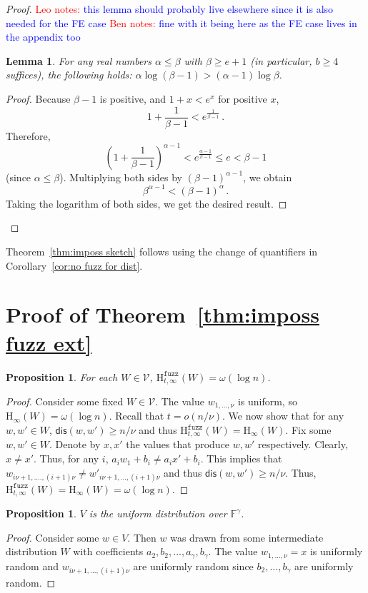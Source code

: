 \documentclass[11pt]{article}
\newcommand{\thref}[1]{\mbox{Theorem~\ref{#1}}}
\newcommand{\corref}[1]{\mbox{Corollary~\ref{#1}}}
\newcommand{\dis}{\ensuremath{\mathsf{dis}}}
\newcommand{\Hoo}{\mathrm{H}_\infty}
\newcommand{\Hfuzz}{\mathrm{H}^{\mathtt{fuzz}}_{t,\infty}}
\newtheorem{lemma}[theorem]{Lemma}
\newtheorem{proposition}[theorem]{Proposition}
\newcommand{\authnote}[2]{{\textcolor{red}{\textsf{#1 notes: }\textcolor{blue}{ #2}}\marginpar{\textcolor{red}{\textbf{!!!!!}}}}}
\newcommand{\authnote}[2]{}
\newcommand{\bnote}[1]{{\authnote{Ben}{#1}}}
\newcommand{\lnote}[1]{{\authnote{Leo}{#1}}}
\begin{document}
\begin{proof}
\lnote{this lemma should probably live elsewhere since it is also needed for the FE case}
\bnote{fine with it being here as the FE case lives in the appendix too}
\begin{lemma}
\label{lem:log-minus-one}
For any real numbers $\alpha \leq \beta$ with $\beta \ge e+1$ (in particular, $b\ge 4$ suffices), the following holds:
$\alpha \log (\beta-1) > (\alpha-1)\log \beta$. 
\end{lemma}

\begin{proof}
Because $\beta-1$ is positive, and $1+x<e^x$ for positive $x$,
$$1+\frac{1}{\beta-1} < e^{\frac{1}{\beta -1}}\,.$$  Therefore, 
$$\left(1+\frac{1}{\beta-1}\right)^{\alpha-1} < e^{\frac{\alpha-1}{\beta-1}}\le e < \beta-1$$ (since $\alpha\le \beta$). Multiplying both sides by $(\beta-1)^{\alpha-1}$, we obtain
$$\beta^{\alpha-1} < (\beta-1)^\alpha\,.$$
Taking the logarithm of both sides, we get the desired result.
\end{proof}

 \end{proof}
\noindent \thref{thm:imposs sketch} follows using the change of quantifiers in \corref{cor:no fuzz for dist}.


\section{Proof of \thref{thm:imposs fuzz ext}}
\label{sec:fuzz ext proof}
\begin{proposition} 
\label{prop:dist fuzzy ent fuzz}
For each $W\in\mathcal{V}$, $\Hfuzz(W) = \omega(\log n)$.
\end{proposition}
\begin{proof}
Consider some fixed $W\in\mathcal{V}$.  The value $w_{1,..., \nu}$ is uniform, so $\Hoo(W) =\omega(\log n)$.  Recall that $t=o (n/\nu)$.  We now show that for any $w, w'\in W$, $\dis(w, w') \ge n/\nu$ and thus $\Hfuzz(W) = \Hoo(W)$.  Fix some $w, w'\in W$.  Denote by $x, x'$ the values that produce $w, w'$ respectively.  Clearly, $x\neq x'$.  Thus, for any $i$, $a_i w_1 + b_i \neq a_i x' + b_i$.  This implies that $w_{i\nu+1,...., (i+1)\nu} \neq w'_{i\nu+1,..., (i+1)\nu}$ and thus $\dis(w, w') \ge n/\nu$.  Thus, $\Hfuzz(W) = \Hoo(W)= \omega(\log n)$.
\end{proof}

\begin{proposition}\label{prop:dist uniform fuzz}
$V$ is the uniform distribution over $\mathbb{F}^\gamma$.
\end{proposition}
\begin{proof}
Consider some $w\in V$.  Then $w$ was drawn from some intermediate distribution $W$ with coefficients $a_2, b_2, ..., a_\gamma , b_\gamma$.  The value $w_{1,...,\nu} =x $ is uniformly random and $w_{i\nu+1,...,(i+1)\nu}$ are uniformly random since $b_2,..., b_\gamma$ are uniformly random.
\end{proof}
\end{document}
